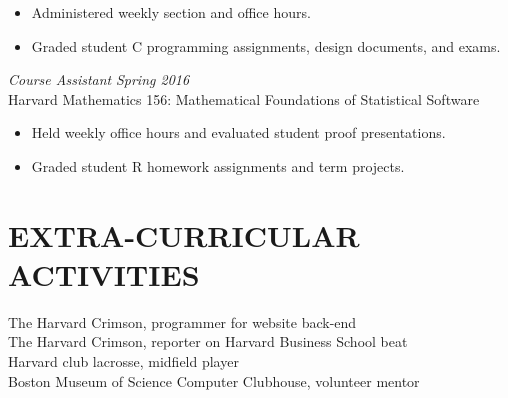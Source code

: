 \documentclass{res}
\begin{document}
\begin{resume}
\begin{itemize}
        \item Administered weekly section and office hours.

        \item Graded student C programming assignments, design documents, and
            exams.

    \end{itemize} 

    {\sl Course Assistant} \hfill {\sl Spring 2016} \\
    Harvard Mathematics 156: Mathematical Foundations of Statistical Software

    \begin{itemize} \itemsep -2.5pt
        \item Held weekly office hours and evaluated student proof
            presentations.

        \item Graded student R homework assignments and term projects.

    \end{itemize} 

\section{EXTRA-CURRICULAR ACTIVITIES}      
    The Harvard Crimson, programmer for website back-end \\
    The Harvard Crimson, reporter on Harvard Business School beat \\
    Harvard club lacrosse, midfield player \\
    Boston Museum of Science Computer Clubhouse, volunteer mentor
 
\end{resume}
\end{document}
